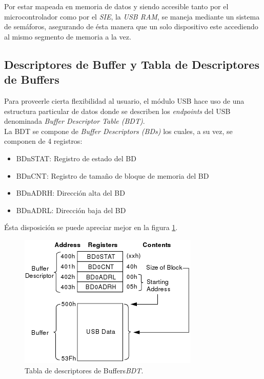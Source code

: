 Por estar mapeada en memoria de datos y siendo accesible tanto por el
microcontrolador como por el \emph{SIE}, la \emph{USB RAM}, se maneja mediante
un sistema de sem\'aforos, asegurando de \'esta manera que un solo dispositivo
este accediendo al mismo segmento de memoria a la vez.

\subsection{Descriptores de Buffer y Tabla de Descriptores de Buffers}
\label{cap:usb_byte}
Para proveerle cierta flexibilidad al usuario, el m\'odulo USB hace uso de
una estructura particular de datos donde se describen los \emph{endpoints} del
USB denominada \emph{Buffer Descriptor Table (BDT)}. \\

La BDT se compone de \emph{Buffer Descriptors (BDs)} los cuales, a su vez, se
componen de 4 registros:

\begin{itemize}
 \item BDnSTAT: Registro de estado del BD

 \item BDnCNT:  Registro de tama\~no de bloque de memoria del BD

 \item BDnADRH: Direcci\'on alta del BD

 \item BDnADRL: Direcci\'on baja del BD
\end{itemize}

\'Esta disposici\'on se puede apreciar mejor en la figura \ref{fig:pic_bdt}.

\begin{figure}[htp]
\centering
\includegraphics[scale=0.6]{./img/pic_bdt.png}
\caption{Tabla de descriptores de Buffers\emph{BDT}.}
\label{fig:pic_bdt}
\end{figure}

